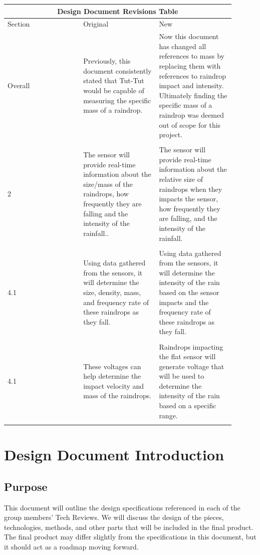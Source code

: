 \documentclass[letterpaper,10pt,draftclsnofoot,onecolumn]{article}
\begin{document}
\begin{center}
\begin{tabular}{ |p{0.3\linewidth}|p{0.3\linewidth}|p{0.3\linewidth}| }
\hline
\multicolumn{3}{|c|}{Design Document Revisions Table} \\
\hline
Section & Original & New \\
\hline
Overall &
Previously, this document consistently stated that Tut-Tut would be capable of measuring the specific mass of a raindrop. &
Now this document has changed all references to mass by replacing them with references to raindrop impact and intensity. Ultimately finding the specific mass of a raindrop was deemed out of scope for this project. \\
 & \\
2 &
The sensor will provide real-time information about the size/mass of the raindrops, how frequently they are falling and the intensity of the rainfall.. &
The sensor will provide real-time information about the relative size of raindrops when they impacts the sensor, how frequently they are falling, and the intensity of the rainfall. \\
 & \\
4.1 &
Using data gathered from the sensors, it will determine the size, density, mass, and frequency rate of these raindrops as they fall. &
Using data gathered from the sensors, it will determine the intensity of the rain based on the sensor impacts and the frequency rate of these raindrops as they fall.  \\
 & \\
4.1 &
These voltages can help determine the impact velocity and mass of the raindrops. &
Raindrops impacting the flat sensor will generate voltage that will be used to determine the intensity of the rain based on a specific range. \\
 & \\
\hline
\end{tabular}
\end{center}

\section{Design Document Introduction}
\subsection{Purpose}
This document will outline the design specifications referenced in each of the group members' Tech Reviews. We will discuss the design of the pieces, technologies, methods, and other parts that will be included in the final product. The final product may differ slightly from the specifications in this document, but it should act as a roadmap moving forward.
\end{document}
